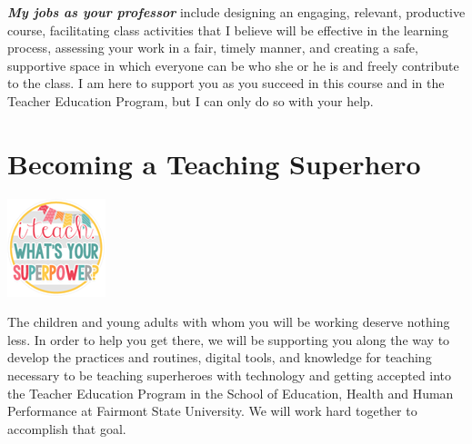 \documentclass{tufte-handout}
\begin{document}
\begin{fullwidth}
\textit{\textbf{My jobs as your professor}} include designing an engaging, relevant, productive course, facilitating class activities that I believe will be effective in the learning process, assessing your work in a fair, timely manner, and creating a safe, supportive space in which everyone can be who she or he is and freely contribute to the class. I am here to support you as you succeed in this course and in the Teacher Education Program, but I can only do so with your help.

\end{fullwidth}
\newpage

\part{Becoming a Teaching Superhero}

\begin{marginfigure}%
	\begin{center}
		\includegraphics[width=0.75\linewidth]{teach-superpower.png}
		\label{fig:teach-superpower}
	\end{center}
\end{marginfigure}


 The children and young adults with whom you will be working deserve nothing less. In order to help you get there, we will be supporting you along the way to develop the practices and routines, digital tools, and knowledge for teaching necessary to be teaching superheroes with technology and getting accepted into the Teacher Education Program in the School of Education, Health and Human Performance at Fairmont State University. We will work hard together to accomplish that goal.
\end{document}
